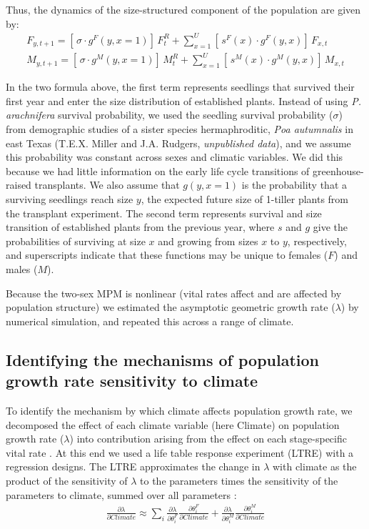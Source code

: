 \documentclass[11pt]{article}
\begin{document}
{Thus, the dynamics of the size-structured component of the population are given by:
\begin{align}\label{eq:dynamics}
F_{y,t+1} = [ \, \sigma \cdot g^{F}(y,x=1) ] \, F^{R}_{t} + \sum_{x=1}^{U} 	[ \, s^{F}(x) \cdot g^{F}(y,x)] \, F_{x,t}
\\
M_{y,t+1} = [ \, \sigma \cdot g^{M}(y,x=1) ] \, M^{R}_{t} + \sum_{x=1}^{U} 	[ \,  s^{M}(x) \cdot g^{M}(y,x) ] \, M_{x,t}
\end{align}

\noindent In the two formula above, the first term represents seedlings that survived their first year and enter the size distribution of established plants.
Instead of using \textit{P. arachnifera} survival probability, we used the seedling survival probability ($\sigma$) from demographic studies of a sister species hermaphroditic, \textit{Poa autumnalis} in east Texas (T.E.X. Miller and J.A. Rudgers, \textit{unpublished data}), and we assume this probability was constant across sexes and climatic variables. 
We did this because we had little information on the early life cycle transitions of greenhouse-raised transplants. 
We also assume that $g(y,x=1)$ is the probability that a surviving seedlings reach size $y$, the expected future size of 1-tiller plants from the transplant experiment.
The second term represents survival and size transition of established plants from the previous year, where $s$ and $g$ give the probabilities of surviving at size $x$ and growing from sizes $x$ to $y$, respectively, and superscripts indicate that these functions may be unique to females ($F$) and males ($M$).

Because the two-sex MPM is nonlinear (vital rates affect and are affected by population structure) we estimated the asymptotic geometric growth rate ($\lambda$) by numerical simulation, and repeated this across a range of climate.

\subsection*{Identifying the mechanisms of population growth rate sensitivity to climate }
To identify the mechanism by which climate affects population growth rate, we decomposed the effect of each climate variable (here Climate) on population growth rate ($\lambda$) into contribution arising from the effect on each stage-specific vital rate \citep{caswell2000matrix}.
At this end we used a life table response experiment (LTRE) with a regression designs. 
The LTRE approximates the change in $\lambda$ with climate  as the product of the sensitivity of $\lambda$ to the parameters times the sensitivity of the parameters to climate, summed over all parameters \citep{caswell1989analysis}:
\begin{align}\label{eq:ltre}
\frac{\partial \lambda}{\partial Climate} \approx \sum_{i} \frac{\partial \lambda}{\partial \theta^{F}_{i}} \frac{\partial \theta^{F}_{i}}{\partial Climate} + \frac{\partial \lambda}{\partial \theta^{M}_{i}} \frac{\partial \theta^{M}_{i}}{\partial Climate}
\end{align}

}
\end{document}
